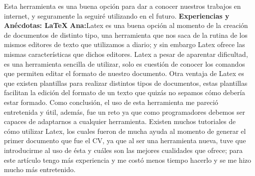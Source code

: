 \documentclass[12pt]{report}
\begin{document}
\newline
Esta herramienta es una buena opción para dar a conocer nuestros trabajos en internet, y seguramente la seguiré utilizando en el futuro.
	\newline
	\newline	
	\newline
	\newline	
	\begingroup
		\large{
			\textbf{
				Experiencias y Anécdotas: LaTeX
				\newline
				\newline
			}
		}
	\endgroup
	\textbf{Ana:\newline\newline}Latex es una buena opción al momento de la creación de documentos de distinto tipo, una herramienta que nos saca de la rutina de los mismos editores de texto que utilizamos a diario; y sin embargo Latex ofrece las mismas características que dichos editores.
\newline	
\newline	
Latex  a pesar de aparentar dificultad, es una herramienta sencilla de utilizar, solo es cuestión de conocer los comandos que permiten editar el formato de nuestro documento.
Otra ventaja de Latex es que existen plantillas para realizar distintos tipos de documentos, estas plantillas facilitan la edición del formato de un texto que quizás no sepamos cómo debería estar formado.
\newline	
\newline	
Como conclusión, el uso de esta herramienta me pareció entretenida y útil, además, fue un reto ya que como programadores debemos ser capaces de adaptarnos a cualquier herramienta.
\newline
\newline		
Existen muchos tutoriales de cómo utilizar Latex, los cuales fueron de mucha ayuda al momento de generar el primer documento que fue el CV, ya que al ser una herramienta nueva, tuve que introducirme al uso de ésta y cuáles son las mejores cualidades que ofrece; para este artículo tengo más experiencia y me costó menos tiempo hacerlo y se me hizo mucho más entretenido.
\newline
\newline	
\end{document}
